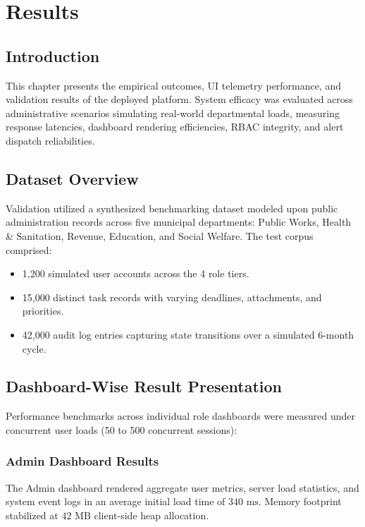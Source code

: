 \chapter{Results}
\label{ch:results}

\section{Introduction}
\label{sec:res_intro}
This chapter presents the empirical outcomes, UI telemetry performance, and validation results of the deployed platform. System efficacy was evaluated across administrative scenarios simulating real-world departmental loads, measuring response latencies, dashboard rendering efficiencies, RBAC integrity, and alert dispatch reliabilities.

\section{Dataset Overview}
\label{sec:dataset_overview}
Validation utilized a synthesized benchmarking dataset modeled upon public administration records across five municipal departments: Public Works, Health \& Sanitation, Revenue, Education, and Social Welfare. The test corpus comprised:
\begin{itemize}
    \item 1,200 simulated user accounts across the 4 role tiers.
    \item 15,000 distinct task records with varying deadlines, attachments, and priorities.
    \item 42,000 audit log entries capturing state transitions over a simulated 6-month cycle.
\end{itemize}

\section{Dashboard-Wise Result Presentation}
\label{sec:dashboard_results}
Performance benchmarks across individual role dashboards were measured under concurrent user loads (50 to 500 concurrent sessions):

\subsection{Admin Dashboard Results}
The Admin dashboard rendered aggregate user metrics, server load statistics, and system event logs in an average initial load time of $340\text{ ms}$. Memory footprint stabilized at $42\text{ MB}$ client-side heap allocation.

